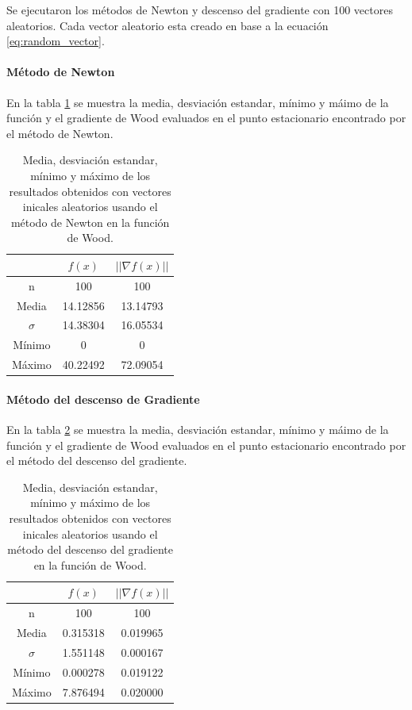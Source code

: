 Se ejecutaron los métodos de Newton y descenso del gradiente con 100 vectores aleatorios. Cada vector aleatorio esta creado en base a la ecuación \ref{eq:random_vector}.

\paragraph{Método de Newton}

En la tabla \ref{table:wood_4_random_newton} se muestra la media, desviación estandar, mínimo y máimo de la función y el gradiente de Wood evaluados en el punto estacionario encontrado por el método de Newton.

\begin{table}[H]
    \centering
    \begin{tabular}{ccc} \hline
                 & $f(x)$   & $||\nabla f(x)||$ \\ \hline
        n        & 100      & 100               \\
        Media    & 14.12856 & 13.14793          \\
        $\sigma$ & 14.38304 & 16.05534          \\
        Mínimo   & 0        & 0                 \\
        Máximo   & 40.22492 & 72.09054          \\\hline
    \end{tabular}
    \caption{Media, desviación estandar, mínimo y máximo de los resultados obtenidos con vectores inicales aleatorios usando el método de Newton en la función de Wood.}
    \label{table:wood_4_random_newton}
\end{table}


\paragraph{Método del descenso de Gradiente}

En la tabla \ref{table:wood_4_random_gradient} se muestra la media, desviación estandar, mínimo y máimo de la función y el gradiente de Wood evaluados en el punto estacionario encontrado por el método del descenso del gradiente.

\begin{table}[H]
    \centering
    \begin{tabular}{ccc} \hline
                 & $f(x)$   & $||\nabla f(x)||$ \\ \hline
        n        & 100      & 100               \\
        Media    & 0.315318 & 0.019965          \\
        $\sigma$ & 1.551148 & 0.000167          \\
        Mínimo   & 0.000278 & 0.019122          \\
        Máximo   & 7.876494 & 0.020000          \\ \hline
    \end{tabular}
    \caption{Media, desviación estandar, mínimo y máximo de los resultados obtenidos con vectores inicales aleatorios usando el método del descenso del gradiente en la función de Wood.}
    \label{table:wood_4_random_gradient}
\end{table}
